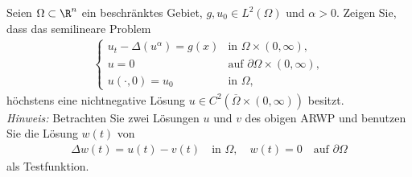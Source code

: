 
\begin{exercise}

Seien $\Omega \subset \R^n$ ein beschränktes Gebiet, $g, u_0 \in L^2(\Omega)$ und
$\alpha > 0$. Zeigen Sie, dass das semilineare Problem
\begin{align*}
  \begin{cases}
    u_t - \Delta(u^\alpha) = g(x) & \text{in } \Omega \times (0,\infty), \\
    u = 0 & \text{auf } \partial\Omega \times (0,\infty), \\
    u(\cdot,0) = u_0 & \text{in } \Omega,
  \end{cases}
\end{align*}
höchstens eine nichtnegative Lösung $u \in C^2(\overline{\Omega} \times (0,\infty))$
besitzt. \\
\textit{Hinweis:} Betrachten Sie zwei Lösungen $u$ und $v$ des obigen ARWP
und benutzen Sie die Lösung $w(t)$ von
\begin{align*}
  \Delta w(t) = u(t) - v(t) \quad \text{in } \Omega, \quad
  w(t) = 0 \quad \text{auf } \partial\Omega
\end{align*}
als Testfunktion.
\end{exercise}


